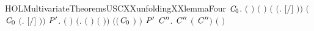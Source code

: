 \begin{SaveVerbatim}{HOLMultivariateTheoremsUSCXXunfoldingXXlemmaFour}
\HOLTokenTurnstile{} \HOLSymConst{\HOLTokenForall{}}    \ensuremath{\HOLBoundVar{C}\sb{\mathrm{0}}}.
          \HOLSymConst{\HOLTokenConj{}}    \HOLSymConst{\HOLTokenConj{}}
          \HOLSymConst{\HOLTokenConj{}}  \ensuremath{(} \ensuremath{)} \ensuremath{(} \ensuremath{)} \HOLSymConst{\HOLTokenConj{}}
       \ensuremath{(} \HOLSymConst{\ensuremath{=}} \ensuremath{(}\HOLTokenLambda{}.  \ensuremath{[}\ensuremath{/}\ensuremath{]} \ensuremath{)}\ensuremath{)} \HOLSymConst{\HOLTokenConj{}} \ensuremath{(}\ensuremath{\HOLBoundVar{C}\sb{\mathrm{0}}} \HOLSymConst{\ensuremath{=}} \ensuremath{(}\HOLTokenLambda{}. \ensuremath{[}\ensuremath{/}\ensuremath{]} \ensuremath{)}\ensuremath{)} \HOLSymConst{\HOLTokenImp{}}
       \HOLSymConst{\HOLTokenForall{}}   \ensuremath{\HOLBoundVar{P}\sp{\prime}}.
           \ensuremath{(}  \HOLSymConst{\ensuremath{=}}  \ensuremath{)} \HOLSymConst{\HOLTokenConj{}}   \HOLSymConst{\HOLTokenConj{}}
            \ensuremath{(}\HOLTokenLambda{}.  \ensuremath{(} \ensuremath{)} \ensuremath{(} \ensuremath{)}\ensuremath{)}  \HOLSymConst{\HOLTokenConj{}}
            \ensuremath{(}\ensuremath{(}\ensuremath{\HOLBoundVar{C}\sb{\mathrm{0}}} \HOLConst{\HOLTokenCompose}   \ensuremath{)} \ensuremath{)}  \ensuremath{\HOLBoundVar{P}\sp{\prime}} \HOLSymConst{\HOLTokenConj{}}   \HOLSymConst{\HOLTokenLeq{}}  \HOLSymConst{\HOLTokenImp{}}
           \HOLSymConst{\HOLTokenExists{}}\ensuremath{\HOLBoundVar{C}\sp{\prime\prime}}.
                 \ensuremath{\HOLBoundVar{C}\sp{\prime\prime}} \HOLSymConst{\HOLTokenConj{}}  \ensuremath{(} \ensuremath{\HOLBoundVar{C}\sp{\prime\prime}}\ensuremath{)} \ensuremath{(} \ensuremath{)} \HOLSymConst{\HOLTokenConj{}}

\end{SaveVerbatim}
